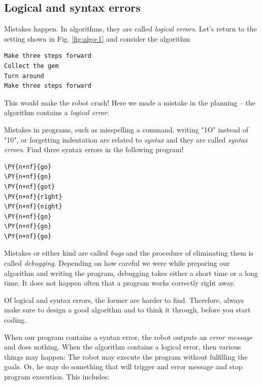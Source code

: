 \subsection{Logical and syntax errors}

Mistakes happen. In algorithms, they are called {\em logical errors}. Let's return to 
the setting shown in Fig. \ref{fig:algo-1} and consider the algorithm

\begin{verbatim}
Make three steps forward
Collect the gem
Turn around
Make three steps forward
\end{verbatim}
This would make the robot crash! Here we made a mistake in the planning
-- the algorithm contains a {\em logical error}.

Mistakes in programs, such as misspelling a command, writing "1O" instead of "10", or forgetting 
indentation are related to {\em syntax} and they are called {\em syntax errors}. Find
three syntax errors in the following program!\\

\begin{bbox}
\begin{Verbatim}[commandchars=\\\{\}]
\PY{n+nf}{go}
\PY{n+nf}{go}
\PY{n+nf}{got}
\PY{n+nf}{r1ght}
\PY{n+nf}{night}
\PY{n+nf}{go}
\PY{n+nf}{go}
\PY{n+nf}{go}
\end{Verbatim}
\end{bbox}
\vspace{6mm}

\noindent
Mistakes or either kind are called {\em bugs} and the procedure of 
eliminating them is called {\em debugging}. Depending on how careful we 
were while preparing our algorithm and writing the program, debugging takes either 
a short time or a long time. It does not happen often that a program works correctly
right away. \\

\begin{gbox}
\begin{center}
Of logical and syntax errors, the former are harder to find. Therefore, 
always make sure to design a good algorithm and to think it through, before you start coding.
\end{center}
\end{gbox}
\vspace{4mm}

\noindent
When our program contains a syntax error,
the robot outputs an {\em error message} and does nothing.
When the algorithm contains a logical error, then various 
things may happen: The robot may execute the program 
without fulfilling the goals. Or, he may do something 
that will trigger and error message and stop program 
execution. This includes:

